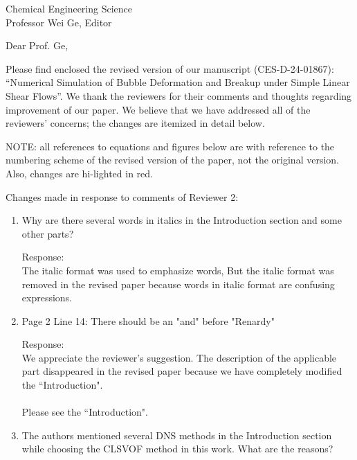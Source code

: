 \documentclass{letter}
\date{\today}
\begin{document}
\begin{letter}{
Chemical Engineering Science\\
Professor Wei Ge, Editor\\}

\opening{Dear Prof. Ge,}

Please find enclosed the revised version of our manuscript (CES-D-24-01867):
``Numerical Simulation of Bubble Deformation and Breakup under 
Simple Linear Shear Flows''.
We thank the reviewers for their comments and thoughts regarding improvement 
of our paper. We believe that we have addressed all of the reviewers’ 
concerns; the changes are itemized in detail below.

\par\noindent
NOTE: all references to equations and figures below are with
reference to the numbering scheme of the revised version of the paper,
not the original version.  Also, changes are hi-lighted in red.
\par\noindent

Changes made in response to comments of Reviewer 2: \begin{enumerate}
\item
\textsf
{Why are there several words in italics in the Introduction section and some other parts?}
\vspace{3 mm}

Response: \\
The italic format was used to emphasize words, But the italic format was removed in the revised 
paper because words in italic format are confusing expressions.\\

\item
\textsf
{Page 2 Line 14: There should be an "and" before "Renardy"}
\vspace{3 mm}

Response: \\
We appreciate the reviewer's suggestion. The description of the applicable part disappeared 
in the revised paper because we have completely modified the ``Introduction".\\
\\
Please see the ``Introduction".
\\

\par\noindent
\item
\textsf
{The authors mentioned several DNS methods in the Introduction section while choosing the CLSVOF method in this work. What are the reasons?}
\vspace{3 mm}


\end{enumerate}
\end{letter}
\end{document}
